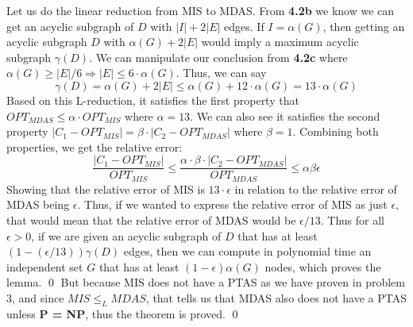 \documentclass[oneside]{homework} %
\begin{document}
\newline
\newline
Let us do the linear reduction from MIS to MDAS. From \textbf{4.2b} we know we can get an acyclic subgraph of $D$ with $|I| + 2|E|$ edges. If $I = \alpha(G)$, then getting an acyclic subgraph $D$ with $\alpha(G) + 2|E|$ would imply a maximum acyclic subgraph $\gamma(D)$. We can manipulate our conclusion from \textbf{4.2c} where $\alpha(G) \geq |E|/6 \Longrightarrow |E| \leq 6\cdot\alpha(G)$. Thus, we can say $$\gamma(D) = \alpha(G) + 2|E| \leq \alpha(G) + 12\cdot\alpha(G) = 13\cdot\alpha(G)$$ Based on this L-reduction, it satisfies the first property that $OPT_{MDAS} \leq \alpha \cdot OPT_{MIS}$ where $\alpha = 13$. We can also see it satisfies the second property $|C_1 - OPT_{MIS}| = \beta\cdot|C_2 - OPT_{MDAS}|$ where $\beta = 1$. Combining both properties, we get the relative error: $$\frac{|C_1 - OPT_{MIS}|}{OPT_{MIS}} \leq \frac{\alpha\cdot\beta\cdot|C_2 - OPT_{MDAS}|}{OPT_{MDAS}} \leq \alpha\beta\epsilon$$ Showing that the relative error of MIS is $13\cdot \epsilon$ in relation to the relative error of MDAS being $\epsilon$. Thus, if we wanted to express the relative error of MIS as just $\epsilon$, that would mean that the relative error of MDAS would be $\epsilon/13$. Thus for all $\epsilon > 0$, if we are given an acyclic subgraph of $D$ that has at least $(1-(\epsilon/13))\gamma(D)$ edges, then we can compute in polynomial time an independent set $G$ that has at least $(1-\epsilon)\alpha(G)$ nodes, which proves the lemma. \hfill\qed
\newline
\newline
But because MIS does not have a PTAS as we have proven in problem 3, and since $MIS \leq_L MDAS$, that tells us that MDAS also does not have a PTAS unless \textbf{P = NP}, thus the theorem is proved. \hfill\qed
\end{document}
